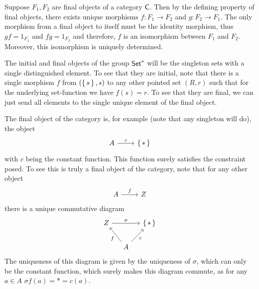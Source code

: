 \begin{solution}
	Suppose $F_1, F_2$ are final objects of a category $\mathsf{C}$. Then by the defining property of final objects, there exists unique morphisms $f: F_1 \to F_2$ and $g: F_2 \to F_1$. The only morphism from a final object to itself must be the identity morphism, thus $gf = 1_{F_1}$ and $fg = 1_{F_2}$ and therefore, $f$ is an isomorphism between $F_1$ and $F_2$. Moreover, this isomorphism is uniquely determined.
\end{solution}

\begin{problem}
\end{problem}

\begin{solution}
	The initial and final objects of the group $\mathsf{Set}^*$ will be the singleton sets with a single distinguished element. To see that they are initial, note that there is a single morphism $f$ from $(\left\{\,s\,\right\}, s)$ to any other pointed set $(R, r)$ such that for the underlying set-function we have $f(s)=r$. To see that they are final, we can just send all elements to the single unique element of the final object.
\end{solution}

\begin{problem}
\end{problem}

\begin{solution}
	The final object of the category is, for example (note that any singleton will do), the object
	\begin{equation*}
		\begin{tikzcd}
			A \arrow[r, "c"] & \set{*}
		\end{tikzcd}
	\end{equation*}
	with $c$ being the constant function. This function surely satisfies the constraint posed. To see this is truly a final object of the category, note that for any other object
	\begin{equation*}
		\begin{tikzcd}
			A \arrow[r, "f"] & Z
		\end{tikzcd}
	\end{equation*}
	there is a unique commutative diagram
	\begin{equation*}
		\begin{tikzcd}[column sep=small]
			Z \arrow[rr, "\sigma"] & & \set{*} \\
			& A \arrow[ul, "f"] \arrow[ur, "c" swap] &
		\end{tikzcd}
	\end{equation*}
	The uniqueness of this diagram is given by the uniqueness of $\sigma$, which can only be the constant function, which surely makes this diagram commute, as for any $a \in A$ $\sigma f(a) = * = c(a)$.
\end{solution}

